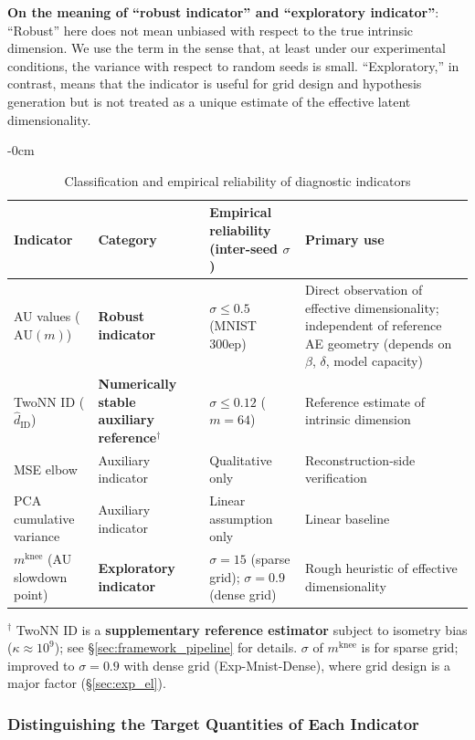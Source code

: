 \documentclass[make,article,submit,pdftex,moreauthors]{Definitions/mdpi}
\newcommand{\kap}{\kappa}
\newcommand{\mknee}{m^{\mathrm{knee}}}
\begin{document}
\textbf{On the meaning of ``robust indicator'' and ``exploratory indicator''}:
``Robust'' here does not mean unbiased with respect to the true intrinsic dimension.
We use the term in the sense that, at least under our experimental conditions,
the variance with respect to random seeds is small.
``Exploratory,'' in contrast, means that the indicator is useful for grid design
and hypothesis generation but is not treated as a unique estimate of the
effective latent dimensionality.

\begin{table}[H]
\begin{adjustwidth}{-\extralength}{0cm}
\centering
\caption{Classification and empirical reliability of diagnostic indicators}
\label{tab:indicator_class}
\small
\begin{tabular}{p{3.2cm}p{3.0cm}p{3.8cm}p{3.8cm}}
\toprule
Indicator & Category & Empirical reliability (inter-seed $\sigma$) & Primary use \\
\midrule
AU values ($\mathrm{AU}(m)$) & \textbf{Robust indicator} & $\sigma \leq 0.5$ (MNIST 300ep) & Direct observation of effective dimensionality; independent of reference AE geometry (depends on $\beta$, $\delta$, model capacity) \\
TwoNN ID ($\hat{d}_\mathrm{ID}$) & \textbf{Numerically stable auxiliary reference}$^\dagger$ & $\sigma \leq 0.12$ ($m=64$) & Reference estimate of intrinsic dimension \\
MSE elbow & Auxiliary indicator & Qualitative only & Reconstruction-side verification \\
PCA cumulative variance & Auxiliary indicator & Linear assumption only & Linear baseline \\
$\mknee$ (AU slowdown point) & \textbf{Exploratory indicator} & $\sigma=15$ (sparse grid); $\sigma=0.9$ (dense grid) & Rough heuristic of effective dimensionality \\
\bottomrule
\end{tabular}
\par\medskip
\footnotesize
$^\dagger$ TwoNN ID is a \textbf{supplementary reference estimator} subject to isometry bias ($\kap \approx 10^9$); see §\ref{sec:framework_pipeline} for details.
$\sigma$ of $\mknee$ is for sparse grid; improved to $\sigma=0.9$ with dense grid (Exp-Mnist-Dense), where grid design is a major factor (§\ref{sec:exp_el}).
\normalsize
\end{adjustwidth}
\end{table}

\subsubsection*{Distinguishing the Target Quantities of Each Indicator}\label{sec:framework_targets}
\end{document}
